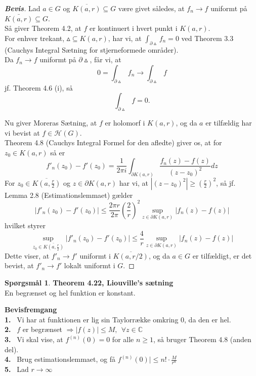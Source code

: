 \documentclass[10pt,a4paper]{article}
\theoremstyle{definition}
\newtheorem{Prob}{Spørgsmål}
\begin{document}
\newpage
\begin{proof}[\textbf{Bevis}]
Lad $a \in G$ og $\overline{K(a,r)} \subseteq G$ være givet således, at $f_n \rightarrow f$ uniformt på $\bar{K(a,r)} \subseteq G$. \\
Så giver Theorem 4.2, at $f$ er kontinuert i hvert punkt i $K(a,r)$. \\

For enhver trekant, $\vartriangle \subseteq K(a,r)$, har vi, at $\int_{\partial \vartriangle} f_n = 0$ ved Theorem 3.3 (Cauchys Integral Sætning for stjerneformede områder). \\

Da $f_n \rightarrow f$ uniformt på $\partial \vartriangle$, får vi, at 
$$0 = \int_{\partial \vartriangle} f_n \rightarrow \int_{\partial  \vartriangle} f$$
jf. Theorem 4.6 (i), så
$$\int_{\partial  \vartriangle} f = 0.$$

Nu giver Moreras Sætning, at $f$ er holomorf i $K(a,r)$, og da $a$ er tilfældig har vi bevist at $f \in \mathcal{H}(G)$. \\

Theorem 4.8 (Cauchys Integral Formel for den afledte) giver os, at for $z_0 \in K(a,r)$ så er
$$f'_n(z_0)-f'(z_0) = \frac{1}{2 \pi i} \int_{\partial K(a,r)} \frac{f_n(z)-f(z)}{(z-z_0)^2}dz$$
For $z_0 \in \overline{K(a, \frac{r}{2})}$ og $z \in \partial K(a,r)$ har vi, at $|(z-z_0)^2| \geq (\frac{r}{2})^2$, så jf. Lemma 2.8 (Estimationslemmaet) gælder 
$$|f'_n(z_0) - f'(z_0)| \leq \frac{2 \pi r}{2 \pi} \left(\frac{2}{r}\right)^2 \sup_{z \in \partial K(a,r)}|f_n(z)-f(z)|$$
hvilket styrer
$$\sup_{z_0 \in \bar{K(a,\frac{r}{2})}}|f'_n (z_0) - f'(z_0)| \leq \frac{4}{r} \sup_{z \in \partial K(a,r)}|f_n(z)-f(z)|$$
Dette viser, at $f'_n \rightarrow f'$ uniformt i $\overline{K(a,r/2)}$, og da $a \in G$ er tilfældigt, er det bevist, at $f'_n \rightarrow f'$ lokalt uniformt i $G$.
\end{proof}







\newpage
\begin{Prob}{\textbf{Theorem 4.22, Liouville's sætning}} \\

En begrænset og hel funktion er konstant.
\end{Prob}

\begin{framed}
\textbf{Bevisfremgang} \\
\textbf{1.} \ Vi har at funktionen er lig sin Taylorrække omkring $0$, da den er hel. \\
\textbf{2.} \  $f$ er begrænset $ \Rightarrow |f(z)| \leq M, \ \ \forall z \in \mathbb{C}$\\
\textbf{3.} \ Vi skal vise, at $f^{(n)}(0) = 0$ for alle $n \geq 1$, så bruger Theorem 4.8 (anden del). \\
\textbf{4.} \ Brug estimationslemmaet, og få $f^{(n)}(0)| \leq n! \cdot \frac{M}{r^n}$ \\
\textbf{5.} \ Lad $r \rightarrow \infty$ 
\end{framed}
\end{document}
